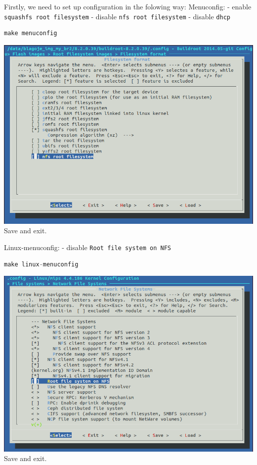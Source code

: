 \documentclass[12pt]{report}
\newcommand{\code}[1]{\texttt{#1}} %
\begin{document}
Firstly, we need to set up configuration in the folowing way:
\newline
Menuconfig:\newline
- enable \code{squashfs root filesystem}\newline
- disable \code{nfs root filesystem} \newline
- disable \code{dhcp} \newline
\begin{lstlisting}[language=C]
    make menuconfig
\end{lstlisting}
\includegraphics[scale=0.55]{1.PNG}
Save and exit.\newline

Linux-menuconfig:\newline
- disable \code{Root file system on NFS}
\begin{lstlisting}[language=C]
    make linux-menuconfig
\end{lstlisting}
\includegraphics[scale=0.55]{2.PNG}
Save and exit. \newline
\end{document}
